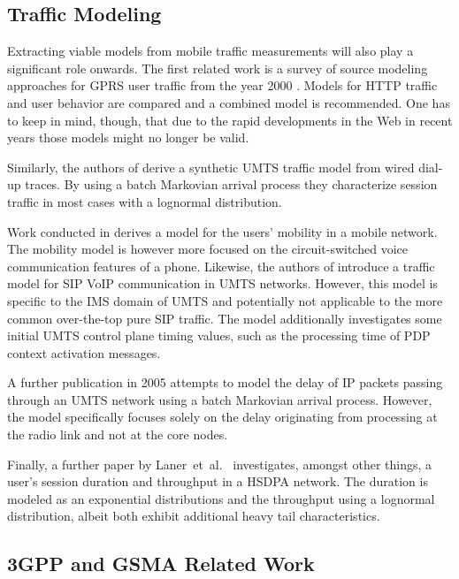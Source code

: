 \subsection{Traffic Modeling}

Extracting viable models from mobile traffic measurements will also play a significant role onwards. The first related work is a survey of source modeling approaches for \gls{GPRS} user traffic from the year 2000 \cite{staehle2000source}. Models for \gls{HTTP} traffic and user behavior are compared and a combined model is recommended. One has to keep in mind, though, that due to the rapid developments in the Web in recent years those models might no longer be valid. 

Similarly, the authors of \cite{965876} derive a synthetic \gls{UMTS} traffic model from wired dial-up traces. By using a batch Markovian arrival process they characterize session traffic in most cases with a lognormal distribution.

Work conducted in \cite{Halepovic:2005:CMU:1089803.1089969} derives a model for the users' mobility in a mobile network. The mobility model is however more focused on the circuit-switched voice communication features of a phone. Likewise, the authors of \cite{Pesch2005385} introduce a traffic model for \gls{SIP} \gls{VoIP} communication in \gls{UMTS} networks. However, this model is specific to the \gls{IMS} domain of \gls{UMTS} and potentially not applicable to the more common over-the-top pure \gls{SIP} traffic. The model additionally investigates some initial \gls{UMTS} control plane timing values, such as the processing time of \gls{PDP} context activation messages.

A further publication in 2005 \cite{Landman200568} attempts to model the delay of \gls{IP} packets passing through an \gls{UMTS} network using a batch Markovian arrival process. However, the model specifically focuses solely on the delay originating from processing at the radio link and not at the core nodes.

Finally, a further paper by Laner~et~al.~\cite{6214330} investigates, amongst other things, a user's session duration and throughput in a \gls{HSDPA} network. The duration is modeled as an exponential distributions and the throughput using a lognormal distribution, albeit both exhibit additional heavy tail characteristics.


\subsection{\texorpdfstring{\acrshort{3GPP}}{3GPP} and \texorpdfstring{\acrshort{GSMA}}{GSMA} Related Work}

